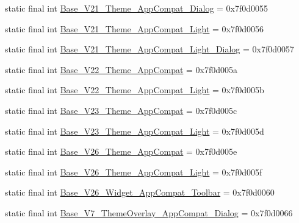 \begin{DoxyCompactItemize}
\item 
static final int \mbox{\hyperlink{classcom_1_1synnapps_1_1carouselview_1_1_r_1_1style_a9bab858558ce49cc819b0fb815fd6eda}{Base\+\_\+\+V21\+\_\+\+Theme\+\_\+\+App\+Compat\+\_\+\+Dialog}} = 0x7f0d0055
\item 
static final int \mbox{\hyperlink{classcom_1_1synnapps_1_1carouselview_1_1_r_1_1style_a5eb8a0c0362dd5927ef2029c6815a5b3}{Base\+\_\+\+V21\+\_\+\+Theme\+\_\+\+App\+Compat\+\_\+\+Light}} = 0x7f0d0056
\item 
static final int \mbox{\hyperlink{classcom_1_1synnapps_1_1carouselview_1_1_r_1_1style_a0e449c4ffd4aaf6b596d89221b95b371}{Base\+\_\+\+V21\+\_\+\+Theme\+\_\+\+App\+Compat\+\_\+\+Light\+\_\+\+Dialog}} = 0x7f0d0057
\item 
static final int \mbox{\hyperlink{classcom_1_1synnapps_1_1carouselview_1_1_r_1_1style_a5fb85ab07769e958670efdeaf44bfbbd}{Base\+\_\+\+V22\+\_\+\+Theme\+\_\+\+App\+Compat}} = 0x7f0d005a
\item 
static final int \mbox{\hyperlink{classcom_1_1synnapps_1_1carouselview_1_1_r_1_1style_a498a886629c607f3cd17331342bd5374}{Base\+\_\+\+V22\+\_\+\+Theme\+\_\+\+App\+Compat\+\_\+\+Light}} = 0x7f0d005b
\item 
static final int \mbox{\hyperlink{classcom_1_1synnapps_1_1carouselview_1_1_r_1_1style_a0be42860764a86dd0029de11b88ac606}{Base\+\_\+\+V23\+\_\+\+Theme\+\_\+\+App\+Compat}} = 0x7f0d005c
\item 
static final int \mbox{\hyperlink{classcom_1_1synnapps_1_1carouselview_1_1_r_1_1style_ad76178305d537c8ea87138f97a47e911}{Base\+\_\+\+V23\+\_\+\+Theme\+\_\+\+App\+Compat\+\_\+\+Light}} = 0x7f0d005d
\item 
static final int \mbox{\hyperlink{classcom_1_1synnapps_1_1carouselview_1_1_r_1_1style_a79303e609c2fb82edcc9727e4a9af0e1}{Base\+\_\+\+V26\+\_\+\+Theme\+\_\+\+App\+Compat}} = 0x7f0d005e
\item 
static final int \mbox{\hyperlink{classcom_1_1synnapps_1_1carouselview_1_1_r_1_1style_a5ec66026e46e923f17f9640b39d3989b}{Base\+\_\+\+V26\+\_\+\+Theme\+\_\+\+App\+Compat\+\_\+\+Light}} = 0x7f0d005f
\item 
static final int \mbox{\hyperlink{classcom_1_1synnapps_1_1carouselview_1_1_r_1_1style_aa4de6606d67a6861be7bc21ceca25b95}{Base\+\_\+\+V26\+\_\+\+Widget\+\_\+\+App\+Compat\+\_\+\+Toolbar}} = 0x7f0d0060
\item 
static final int \mbox{\hyperlink{classcom_1_1synnapps_1_1carouselview_1_1_r_1_1style_a06729fdf60ee0fb1cf48080a4d731e43}{Base\+\_\+\+V7\+\_\+\+Theme\+Overlay\+\_\+\+App\+Compat\+\_\+\+Dialog}} = 0x7f0d0066

\end{DoxyCompactItemize}
